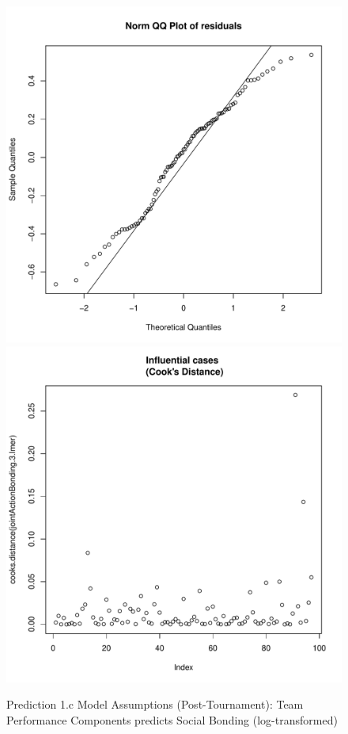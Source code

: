 \begin{CJK}{UTF8}{gbsn}
\begin{figure}[!htbp]
              \includegraphics[scale =.4]{images/MLM3aLogQQNorm.pdf}
              \includegraphics[scale =.4]{images/MLM3aLogCooksD.pdf}
              \caption{Prediction 1.c Model Assumptions (Post-Tournament): Team Performance Components predicts Social Bonding (log-transformed)}
              \label{fig:MLM3aLogAssumptions}
            \end{figure}








\end{CJK}
